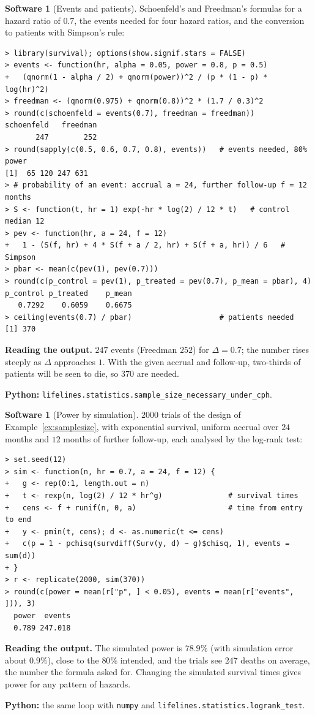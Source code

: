 \documentclass[11pt,a4paper]{article}
\numberwithin{equation}{section}
\theoremstyle{definition}
\newtheorem{software}[thm]{Software}
\begin{document}
\begin{software}[Events and patients]
\label{sw:samplesize}
Schoenfeld's and Freedman's formulas for a hazard ratio of $0.7$, the events needed for four hazard ratios, and the conversion to patients with Simpson's rule:
{\small\begin{verbatim}
> library(survival); options(show.signif.stars = FALSE)
> events <- function(hr, alpha = 0.05, power = 0.8, p = 0.5)
+   (qnorm(1 - alpha / 2) + qnorm(power))^2 / (p * (1 - p) * log(hr)^2)
> freedman <- (qnorm(0.975) + qnorm(0.8))^2 * (1.7 / 0.3)^2
> round(c(schoenfeld = events(0.7), freedman = freedman))
schoenfeld   freedman 
       247        252 
> round(sapply(c(0.5, 0.6, 0.7, 0.8), events))   # events needed, 80% power
[1]  65 120 247 631
> # probability of an event: accrual a = 24, further follow-up f = 12 months
> S <- function(t, hr = 1) exp(-hr * log(2) / 12 * t)   # control median 12
> pev <- function(hr, a = 24, f = 12)
+   1 - (S(f, hr) + 4 * S(f + a / 2, hr) + S(f + a, hr)) / 6   # Simpson
> pbar <- mean(c(pev(1), pev(0.7)))
> round(c(p_control = pev(1), p_treated = pev(0.7), p_mean = pbar), 4)
p_control p_treated    p_mean 
   0.7292    0.6059    0.6675 
> ceiling(events(0.7) / pbar)                    # patients needed
[1] 370
\end{verbatim}}
\textbf{Reading the output.} $247$ events (Freedman $252$) for $\Delta = 0.7$; the number rises steeply as $\Delta$ approaches $1$. With the given accrual and follow-up, two-thirds of patients will be seen to die, so $370$ are needed.

\textbf{Python:} \texttt{lifelines.statistics.sample\_size\_necessary\_under\_cph}.
\end{software}

\begin{software}[Power by simulation]
\label{sw:power}
$2000$ trials of the design of Example~\ref{ex:samplesize}, with exponential survival, uniform accrual over $24$ months and $12$ months of further follow-up, each analysed by the log-rank test:
{\small\begin{verbatim}
> set.seed(12)
> sim <- function(n, hr = 0.7, a = 24, f = 12) {
+   g <- rep(0:1, length.out = n)
+   t <- rexp(n, log(2) / 12 * hr^g)               # survival times
+   cens <- f + runif(n, 0, a)                     # time from entry to end
+   y <- pmin(t, cens); d <- as.numeric(t <= cens)
+   c(p = 1 - pchisq(survdiff(Surv(y, d) ~ g)$chisq, 1), events = sum(d))
+ }
> r <- replicate(2000, sim(370))
> round(c(power = mean(r["p", ] < 0.05), events = mean(r["events", ])), 3)
  power  events 
  0.789 247.018 
\end{verbatim}}
\textbf{Reading the output.} The simulated power is $78.9\%$ (with simulation error about $0.9\%$), close to the $80\%$ intended, and the trials see $247$ deaths on average, the number the formula asked for. Changing the simulated survival times gives power for any pattern of hazards.

\textbf{Python:} the same loop with \texttt{numpy} and \texttt{lifelines.statistics.logrank\_test}.
\end{software}
\end{document}
